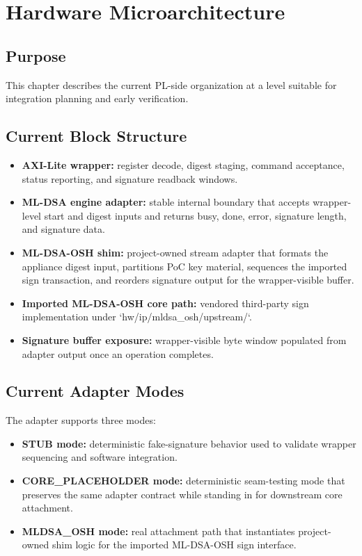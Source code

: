 \chapter{Hardware Microarchitecture}

\section*{Purpose}
This chapter describes the current PL-side organization at a level suitable for integration planning and early verification.

\section{Current Block Structure}
\begin{itemize}[leftmargin=*]
  \item \textbf{AXI-Lite wrapper:} register decode, digest staging, command acceptance, status reporting, and signature readback windows.
  \item \textbf{ML-DSA engine adapter:} stable internal boundary that accepts wrapper-level start and digest inputs and returns busy, done, error, signature length, and signature data.
  \item \textbf{ML-DSA-OSH shim:} project-owned stream adapter that formats the appliance digest input, partitions PoC key material, sequences the imported sign transaction, and reorders signature output for the wrapper-visible buffer.
  \item \textbf{Imported ML-DSA-OSH core path:} vendored third-party sign implementation under `hw/ip/mldsa\_osh/upstream/`.
  \item \textbf{Signature buffer exposure:} wrapper-visible byte window populated from adapter output once an operation completes.
\end{itemize}

\section{Current Adapter Modes}
The adapter supports three modes:
\begin{itemize}[leftmargin=*]
  \item \textbf{STUB mode:} deterministic fake-signature behavior used to validate wrapper sequencing and software integration.
  \item \textbf{CORE\_PLACEHOLDER mode:} deterministic seam-testing mode that preserves the same adapter contract while standing in for downstream core attachment.
  \item \textbf{MLDSA\_OSH mode:} real attachment path that instantiates project-owned shim logic for the imported ML-DSA-OSH sign interface.
\end{itemize}

